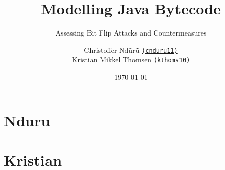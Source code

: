 \documentclass[10pt]{beamer}
\title{Modelling Java Bytecode}
\subtitle{Assessing Bit Flip Attacks and Countermeasures} %
\date{\today}
\author[cnduru11 \and kthoms10]{
  Christoffer Nd\~ur\~u
  \href{mailto:cnuduru11@student.aau.dk}{{\tt (cnduru11)}}\\
  Kristian Mikkel Thomsen  \href{mailto:kthoms10@student.aau.dk}{{\tt (kthoms10)}}\\
}
\institute[
  Dept.\ of Distributed Systems\\
  Aalborg University\\
  Denmark
] %
{%
  Department of Distributed Systems\\
  Aalborg University\\
  Denmark
  
}
\begin{document}
{\aauwavesbg%
\begin{frame} %
  \titlepage
\end{frame}}


\section{Nduru}


\section{Kristian}


\end{document}

